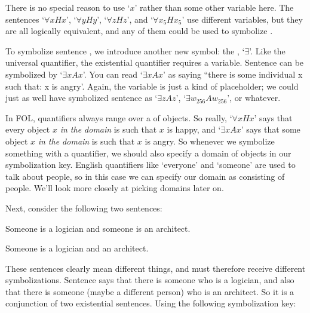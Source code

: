 There is no special reason to use `$x$' rather than some other variable here. The sentences `$\forall x Hx$', `$\forall y Hy$', `$\forall z Hz$', and `$\forall x_5 Hx_5$' use different variables, but they are all logically equivalent, and any of them could be used to symbolize .

To symbolize sentence , we introduce another new symbol: the , `$\exists$'. Like the universal quantifier, the existential quantifier requires a variable. Sentence  can be symbolized by `$\exists x Ax$'. You can read `$\exists x Ax$' as saying ``there is some individual x such that: x is angry'. Again, the variable is just a kind of placeholder; we could just as well have symbolized sentence  as `$\exists z Az$', `$\exists w_{256} Aw_{256}$', or whatever.


In FOL, quantifiers always range over a  of objects.  So really, `$\forall xHx$' says that every object $x$ \emph{in the domain} is such that $x$ is happy, and `$\exists xAx$' says that some object $x$ \emph{in the domain} is such that $x$ is angry.  So whenever we symbolize something with a quantifier, we should also specify a domain of objects in our symbolization key.  English quantifiers like `everyone' and `someone' are used to talk about people, so in this case we can specify our domain as consisting of people.  We'll look more closely at picking domains later on.




Next, consider the following two sentences:

	\begin{earg}
		\item[\ex{scope1}] Someone is a logician and someone is an architect.
		\item[\ex{scope2}] Someone is a logician and an architect.
	\end{earg}
These sentences clearly mean different things, and must therefore receive different symbolizations.  Sentence  says that there is someone who is a logician, and also that there is someone (maybe a different person) who is an architect. So it is a conjunction of two existential sentences. Using the following symbolization key:

